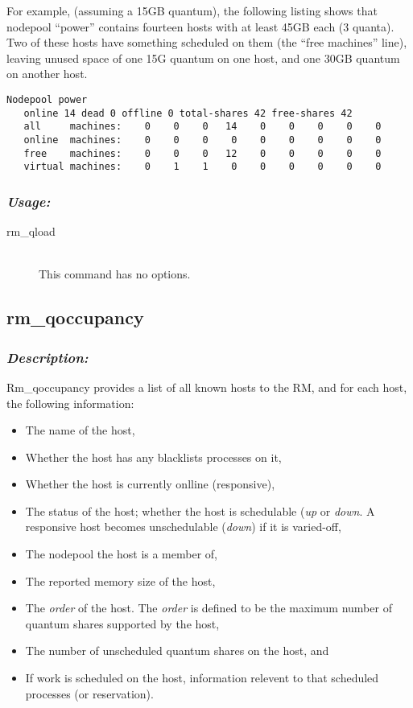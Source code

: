     For example, (assuming a 15GB quantum), the following listing shows
    that nodepool ``power'' contains fourteen hosts with at least 45GB each (3 quanta).  Two
    of these hosts have something scheduled on them (the ``free
    machines'' line), leaving unused space of one 15G quantum on one
    host, and one 30GB quantum on another host.

\begin{verbatim}
Nodepool power
   online 14 dead 0 offline 0 total-shares 42 free-shares 42
   all     machines:    0    0    0   14    0    0    0    0    0 
   online  machines:    0    0    0    0    0    0    0    0    0 
   free    machines:    0    0    0   12    0    0    0    0    0 
   virtual machines:    0    1    1    0    0    0    0    0    0 
\end{verbatim}

    \subsubsection{\em Usage:}
    \begin{description}
      \item[rm\_qload] \hfill \\ 
        This command has no options.
      \end{description}

\fi     %
       
\subsection{rm\_qoccupancy}
\label{subsec:admin.rm-qoccupancy}

    \subsubsection{{\em Description:}}
    Rm\_qoccupancy provides a list of all known hosts to the RM, and for each host, the following information:
    \begin{itemize}
      \item The name of the host,
      \item Whether the host has any blacklists processes on it,
      \item Whether the host is currently onlline (responsive),
      \item The status of the host; whether the host is schedulable ({\em up} or {\em down}.  A responsive host becomes
        unschedulable ({\em down}) if it is varied-off,
      \item The nodepool the host is a member of,
      \item The reported memory size of the host, 
      \item The {\em order} of the host.  The {\em order} is defined to be the maximum number of quantum shares
        supported by the host,
      \item The number of unscheduled quantum shares on the host, and
      \item If work is scheduled on the host, information relevent to that scheduled processes (or reservation).
    \end{itemize}

